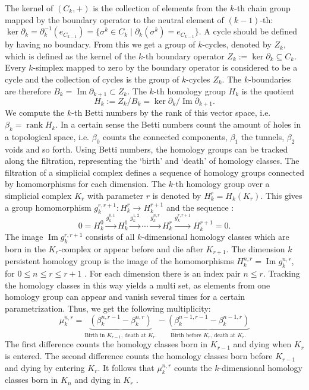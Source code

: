 \documentclass[runningheads]{llncs}
\DeclareMathOperator{\Ima}{\text{Im}}
\DeclareMathOperator{\rank}{\text{rank}}
\begin{document}
The kernel of $(C_k,+)$ is the collection of elements from the $k$-th chain group mapped by the boundary operator to the neutral element of $(k-1)$-th: $\ker \partial_k = \partial_k^{-1}(e_{C_{k-1}}) = \{\sigma^k \in C_k \; \vert \; \partial_k(\sigma^k)= e_{C_{k-1}}\}$. A cycle should be defined by having no boundary. From this we get a group of $k$-cycles, denoted by $Z_k$, which is defined as the kernel of the $k$-th boundary operator $Z_k := \ker \partial_k \subseteq C_k$. Every $k$-simplex mapped to zero by the boundary operator is considered to be a cycle and the collection of cycles is the group of $k$-cycles $Z_k$. The $k$-boundaries are therefore $B_k = \Ima \partial_{k+1} \subset Z_k$. The $k$-th homology group $H_k$ is the quotient
\begin{equation}
  H_k := Z_k / B_k = \ker \partial_k / \Ima \partial_{k+1}.
\end{equation}
We compute the $k$-th Betti numbers by the rank of this vector space, i.e. $\beta_k = \rank H_k$. In a certain sense the Betti numbers count the amount of holes in a topological space, i.e. $\beta_0$ counts the connected components, $\beta_1$ the tunnels, $\beta_2$ voids and so forth. Using Betti numbers, the homology groups can be tracked along the filtration, representing the `birth' and `death' of homology classes. The filtration of a simplicial complex defines a sequence of homology groups connected by homomorphisms for each dimension. The $k$-th homology group over a simplicial complex $K_r$ with parameter $r$ is denoted by $H_k^r = H_k(K_r)$. This gives a group homomorphism $g^{r,r+1}_k: H_k^r \rightarrow H_k^{r+1}$ and the sequence \cite{edelsbrunner2008persistent}:
\begin{equation}
0 = H_k^0 \xrightarrow{g^{0,1}_k} H_k^1 \xrightarrow{g^{1,2}_k} \cdots \xrightarrow{g^{n,r}_k} H_k^r \xrightarrow{g^{r,r+1}_k} H_k^{r+1} = 0.
\end{equation}
The image $\Ima g^{r,r+1}_k$ consists of all $k$-dimensional homology classes which are born in the $K_r$-complex or appear before and die after $K_{r+1}$. The dimension $k$ persistent homology group is the image of the homomorphisms $H_k^{n,r} = \Ima g_k^{n,r}$, for $0\leq n \leq r \leq r+1$ \cite{edelsbrunner2008persistent}. For each dimension there is an index pair $n \leq r$. Tracking the homology classes in this way yields a multi set, as elements from one homology group can appear and vanish several times for a certain parametrization. Thus, we get the following multiplicity:
\begin{equation}
\mu^{n,r}_k = \underbrace{(\beta_k^{n,r-1} - \beta_k^{n,r})}_{\text{Birth in $K_{r-1}$, death at $K_r$.}} - \underbrace{(\beta_k^{n-1,r-1}-\beta_k^{n-1,r})}_{\text{Birth before $K_r$, death at $K_r$.}}
\end{equation}
The first difference counts the homology classes born in $K_{r-1}$ and dying when $K_r$ is entered. The second difference counts the homology classes born before $K_{r-1}$ and dying by entering $K_r$. It follows that $\mu^{n,r}_k$ counts the $k$-dimensional homology classes born in $K_n$ and dying in $K_r$ \cite{edelsbrunner2008persistent}.
\end{document}
